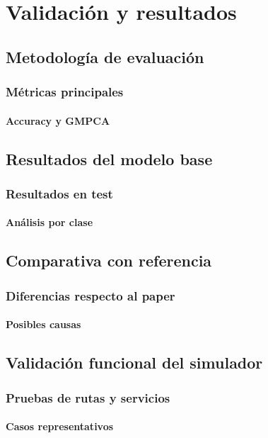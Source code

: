 \chapter{Validación y resultados}

\section{Metodología de evaluación}
\subsection{Métricas principales}
\subsubsection{Accuracy y GMPCA}

\section{Resultados del modelo base}
\subsection{Resultados en test}
\subsubsection{Análisis por clase}

\section{Comparativa con referencia}
\subsection{Diferencias respecto al paper}
\subsubsection{Posibles causas}

\section{Validación funcional del simulador}
\subsection{Pruebas de rutas y servicios}
\subsubsection{Casos representativos}

